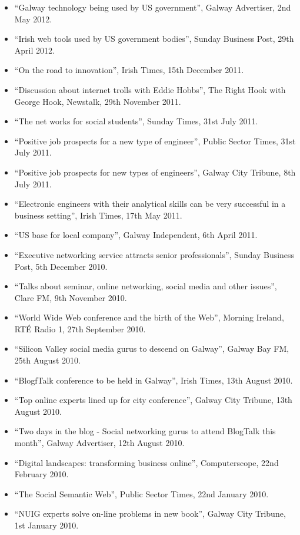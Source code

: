 \documentclass[10pt,a4paper]{res} %
\begin{document}
\begin{resume}
{\begin{itemize}
\item ``Galway technology being used by US government'', Galway Advertiser, 2nd May 2012.
\item ``Irish web tools used by US government bodies'', Sunday Business Post, 29th April 2012.
\item ``On the road to innovation'', Irish Times, 15th December 2011.
\item ``Discussion about internet trolls with Eddie Hobbs'', The Right Hook with George Hook, Newstalk, 29th November 2011.
\item ``The net works for social students'', Sunday Times, 31st July 2011.
\item ``Positive job prospects for a new type of engineer'', Public Sector Times, 31st July 2011.
\item ``Positive job prospects for new types of engineers'', Galway City Tribune, 8th July 2011.
\item ``Electronic engineers with their analytical skills can be very successful in a business setting'', Irish Times, 17th May 2011.
\item ``US base for local company'', Galway Independent, 6th April 2011.
\item ``Executive networking service attracts senior professionals'', Sunday Business Post, 5th December 2010.
\item ``Talks about seminar, online networking, social media and other issues'', Clare FM, 9th November 2010.
\item ``World Wide Web conference and the birth of the Web'', Morning Ireland, RT\'{E} Radio 1, 27th September 2010.
\item ``Silicon Valley social media gurus to descend on Galway'', Galway Bay FM, 25th August 2010.
\item ``BlogfTalk conference to be held in Galway'', Irish Times, 13th August 2010.
\item ``Top online experts lined up for city conference'', Galway City Tribune, 13th August 2010.
\item ``Two days in the blog - Social networking gurus to attend BlogTalk this month'', Galway Advertiser, 12th August 2010.
\item ``Digital landscapes: transforming business online'', Computerscope, 22nd February 2010.
\item ``The Social Semantic Web'', Public Sector Times, 22nd January 2010.
\item ``NUIG experts solve on-line problems in new book'', Galway City Tribune, 1st January 2010.

\end{itemize}}
\end{resume}
\end{document}
